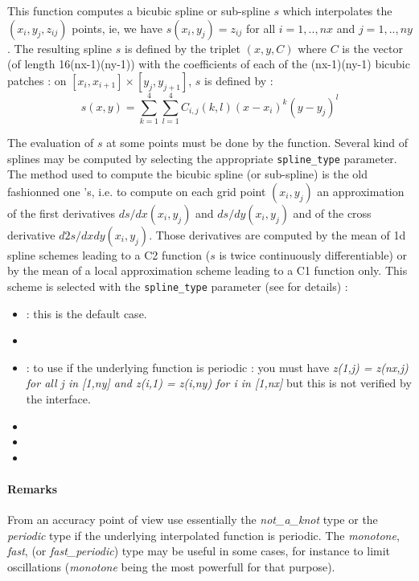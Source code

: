 \begin{mandescription}
    This function computes a bicubic spline or sub-spline $s$ which interpolates the 
    $(x_i,y_j,z_{ij})$ points, ie, we have $s(x_i,y_j)=z_{ij}$ for all  $i=1,..,nx$
    and $j=1,..,ny$. 
    The resulting spline $s$ is defined by the triplet $(x,y,C)$ where
    $C$ is the vector (of length 16(nx-1)(ny-1)) with the coefficients of each
    of the (nx-1)(ny-1) bicubic patches : on $[x_i, x_{i+1}] \times
    [y_j, y_{j+1}]$, $s$ is defined by :
    $$
       s(x,y) = \sum_{k=1}^4  \sum_{l=1}^4  C_{i,j}(k,l) (x - x_i)^k
       (y - y_j)^l
    $$

    The evaluation of  $s$ at some points must be done by the   
    function. Several kind of splines may be computed by selecting the appropriate 
    \verb!spline_type! parameter. The method used to compute the bicubic spline
    (or sub-spline) is the old fashionned one 's, i.e. to compute on each grid point
    $(x_i,y_j)$ an approximation of the first derivatives $ds/dx(x_i,y_j)$
    and $ds/dy(x_i,y_j)$ and of the cross derivative $d2s/dxdy(x_i,y_j)$.
    Those derivatives are computed by the mean of 1d spline schemes leading to a C2
    function ($s$ is twice continuously differentiable) or by the mean of a
    local approximation scheme leading to a C1 function only. This scheme is selected
    with the \verb!spline_type! parameter (see   for details) :  
    
  \begin{itemize}

       \item {}: this is the default case.
       \item {} 
       \item {}: to use if the underlying function is periodic : you must have {\em z(1,j) = z(nx,j) for
              all j in [1,ny] and  z(i,1) = z(i,ny) for i in [1,nx]} but this is not verified
              by the interface.
       \item {} 
       \item {} 
       \item {}  
  \end{itemize}

  \end{mandescription}


  \paragraph{Remarks}
From an accuracy point of view use essentially the {\em not\_a\_knot} type or 
the {\em periodic} type if the underlying interpolated function is periodic.
The {\em monotone}, {\em fast},  (or {\em fast\_periodic}) type may
be useful in some cases, for instance to limit oscillations ({\em monotone} being the
most powerfull for that purpose).
    

